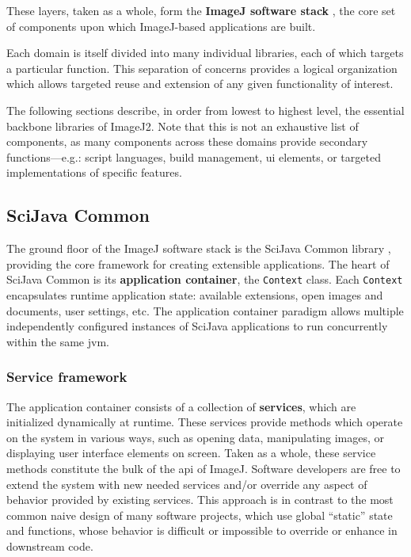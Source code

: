 \documentclass{bmcart}
\begin{document}
These layers, taken as a whole, form the \textbf{ImageJ software stack}
\cite{imagej_architecture}, the core set of components upon which ImageJ-based
applications are built.

Each domain is itself divided into many individual libraries, each of which
targets a particular function. This separation of concerns provides a logical
organization which allows targeted reuse and extension of any given
functionality of interest.

The following sections describe, in order from lowest to highest level, the
essential backbone libraries of ImageJ2. Note that this is not an exhaustive
list of components, as many components across these domains provide secondary
functions---e.g.: script languages, build management, \acrshort{ui} elements,
or targeted implementations of specific features.

\subsection*{SciJava Common}
The ground floor of the ImageJ software stack is the SciJava Common library
\cite{imagej_sjc}, providing the core framework for creating extensible
applications. The heart of SciJava Common is its \textbf{application
container}, the \texttt{Context} class. Each \texttt{Context} encapsulates
runtime application state: available extensions, open images and documents,
user settings, etc. The application container paradigm allows multiple
independently configured instances of SciJava applications to run concurrently
within the same \acrfull{jvm}.

\subsubsection*{Service framework}
The application container consists of a collection of \textbf{services}, which
are initialized dynamically at runtime. These services provide methods which
operate on the system in various ways, such as opening data, manipulating
images, or displaying user interface elements on screen. Taken as a whole,
these service methods constitute the bulk of the \acrfull{api} of ImageJ.
Software developers are free to extend the system with new needed services
and/or override any aspect of behavior provided by existing services. This
approach is in contrast to the most common naive design of many software
projects, which use global ``static'' state and functions, whose behavior is
difficult or impossible to override or enhance in downstream code.
\end{document}
